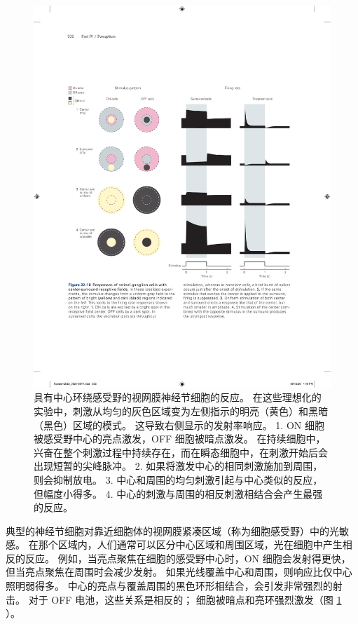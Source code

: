 \begin{figure}[htbp]
	\centering
	\includegraphics[width=1.0\linewidth]{chap22/fig_22_10}
	\caption{具有中心环绕感受野的视网膜神经节细胞的反应。 
		在这些理想化的实验中，刺激从均匀的灰色区域变为左侧指示的明亮（黄色）和黑暗（黑色）区域的模式。 这导致右侧显示的发射率响应。 
		1. ON 细胞被感受野中心的亮点激发，OFF 细胞被暗点激发。 在持续细胞中，兴奋在整个刺激过程中持续存在，而在瞬态细胞中，在刺激开始后会出现短暂的尖峰脉冲。 
		2. 如果将激发中心的相同刺激施加到周围，则会抑制放电。 
		3. 中心和周围的均匀刺激引起与中心类似的反应，但幅度小得多。 
		4. 中心的刺激与周围的相反刺激相结合会产生最强的反应。}
	\label{fig:22_10}
\end{figure}

典型的神经节细胞对靠近细胞体的视网膜紧凑区域（称为细胞感受野）中的光敏感。 
在那个区域内，人们通常可以区分中心区域和周围区域，光在细胞中产生相反的反应。 
例如，当亮点聚焦在细胞的感受野中心时，ON 细胞会发射得更快，但当亮点聚焦在周围时会减少发射。 
如果光线覆盖中心和周围，则响应比仅中心照明弱得多。 
中心的亮点与覆盖周围的黑色环形相结合，会引发非常强烈的射击。 
对于 OFF 电池，这些关系是相反的； 细胞被暗点和亮环强烈激发（图 \ref{fig:22_10} ）。



